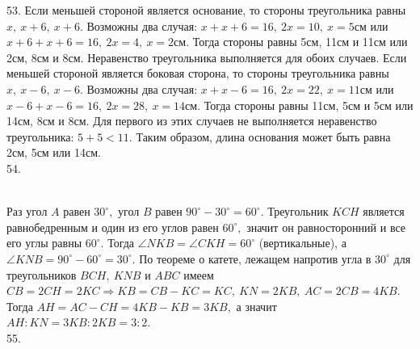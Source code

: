 \documentclass[12pt]{article}
\begin{document}
53. Если меньшей стороной является основание, то стороны треугольника равны $x,\ x+6,\ x+6.$ Возможны два случая: $x+x+6=16,\ 2x=10,\ x=5$см или $x+6+x+6=16,\ 2x=4,\ x=2$см. Тогда стороны равны 5см, 11см и 11см или 2см, 8см и 8см. Неравенство треугольника выполняется для обоих случаев. Если меньшей стороной является боковая сторона, то стороны треугольника равны $x,\ x-6,\ x-6.$ Возможны два случая: $x+x-6=16,\ 2x=22,\ x=11$см или $x-6+x-6=16,\ 2x=28,\ x=14$см. Тогда стороны равны 11см, 5см и 5см или 14см, 8см и 8см. Для первого из этих случаев не выполняется неравенство треугольника: $5+5<11.$ Таким образом, длина основания может быть равна 2см, 5см или 14см.\\
54. \begin{figure}[ht!]
\end{figure}\\
Раз угол $A$ равен $30^\circ,$ угол $B$ равен $90^\circ-30^\circ=60^\circ.$ Треугольник $KCH$ является равнобедренным и один из его углов равен $60^\circ,$ значит он равносторонний и все его углы равны $60^\circ.$ Тогда $\angle NKB=\angle CKH=60^\circ$ (вертикальные), а $\angle KNB=90^\circ-60^\circ=30^\circ.$ По теореме о катете, лежащем напротив угла в $30^\circ$ для треугольников $BCH,\ KNB$ и $ABC$ имеем $CB=2CH=2KC\Rightarrow KB=CB-KC=KC,\ KN=2KB,\ AC=2CB=4KB.$ Тогда $AH=AC-CH=4KB-KB=3KB,$ а значит $AH:KN=3KB:2KB=3:2.$\\
55. \begin{figure}[ht!]
\end{figure}\\
\end{document}
